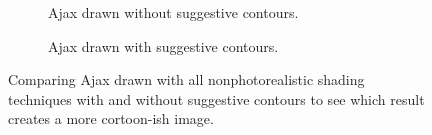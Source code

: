 \documentclass[10pt,twocolumn,letterpaper]{article}
\begin{document}
\begin{figure}
    \centering
    \begin{subfigure}{.48\linewidth}
        \caption{Ajax drawn without suggestive contours.}
        \label{fig:ajax-base}
    \end{subfigure}
    \hfill
    \begin{subfigure}{.48\linewidth}
        \caption{Ajax drawn with suggestive contours.}
        \label{fig:ajax-final}
    \end{subfigure}
    \caption{Comparing Ajax drawn with all nonphotorealistic shading techniques with and without suggestive contours to see which result creates a more cortoon-ish image.}
    \label{fig:ajax-compare}
\end{figure}
\end{document}
